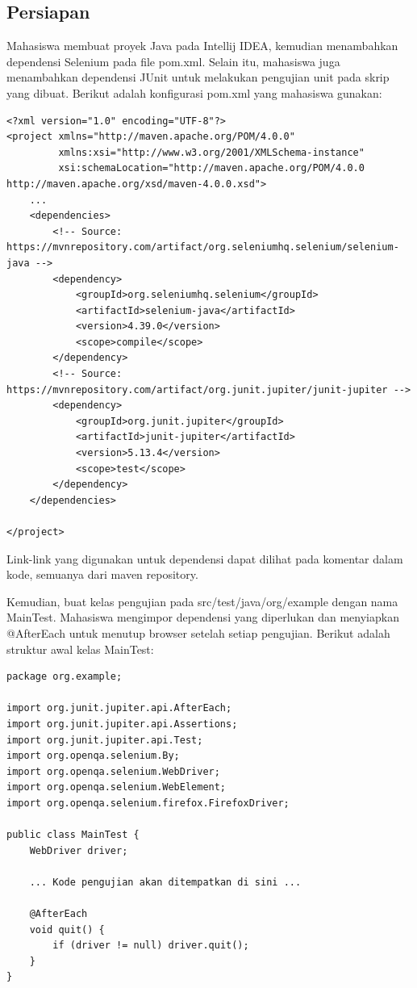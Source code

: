 \documentclass[a4paper,12pt]{article}
\begin{document}
\subsection{Persiapan}

Mahasiswa membuat proyek Java pada Intellij IDEA, kemudian menambahkan dependensi Selenium pada file pom.xml. Selain itu, mahasiswa juga menambahkan dependensi JUnit untuk melakukan pengujian unit pada skrip yang dibuat. Berikut adalah konfigurasi pom.xml yang mahasiswa gunakan:

\begin{lstlisting}[style=xmlstyle]
<?xml version="1.0" encoding="UTF-8"?>
<project xmlns="http://maven.apache.org/POM/4.0.0"
         xmlns:xsi="http://www.w3.org/2001/XMLSchema-instance"
         xsi:schemaLocation="http://maven.apache.org/POM/4.0.0 http://maven.apache.org/xsd/maven-4.0.0.xsd">
    ...
    <dependencies>
        <!-- Source: https://mvnrepository.com/artifact/org.seleniumhq.selenium/selenium-java -->
        <dependency>
            <groupId>org.seleniumhq.selenium</groupId>
            <artifactId>selenium-java</artifactId>
            <version>4.39.0</version>
            <scope>compile</scope>
        </dependency>
        <!-- Source: https://mvnrepository.com/artifact/org.junit.jupiter/junit-jupiter -->
        <dependency>
            <groupId>org.junit.jupiter</groupId>
            <artifactId>junit-jupiter</artifactId>
            <version>5.13.4</version>
            <scope>test</scope>
        </dependency>
    </dependencies>

</project>
\end{lstlisting}

Link-link yang digunakan untuk dependensi dapat dilihat pada komentar dalam kode, semuanya dari maven repository.

Kemudian, buat kelas pengujian pada src/test/java/org/example dengan nama MainTest. Mahasiswa mengimpor dependensi yang diperlukan dan menyiapkan @AfterEach untuk menutup browser setelah setiap pengujian. Berikut adalah struktur awal kelas MainTest:

\begin{lstlisting}[style=javastyle]
package org.example;

import org.junit.jupiter.api.AfterEach;
import org.junit.jupiter.api.Assertions;
import org.junit.jupiter.api.Test;
import org.openqa.selenium.By;
import org.openqa.selenium.WebDriver;
import org.openqa.selenium.WebElement;
import org.openqa.selenium.firefox.FirefoxDriver;

public class MainTest {
    WebDriver driver;

    ... Kode pengujian akan ditempatkan di sini ...

    @AfterEach
    void quit() {
        if (driver != null) driver.quit();
    }
}
\end{lstlisting}
\end{document}
